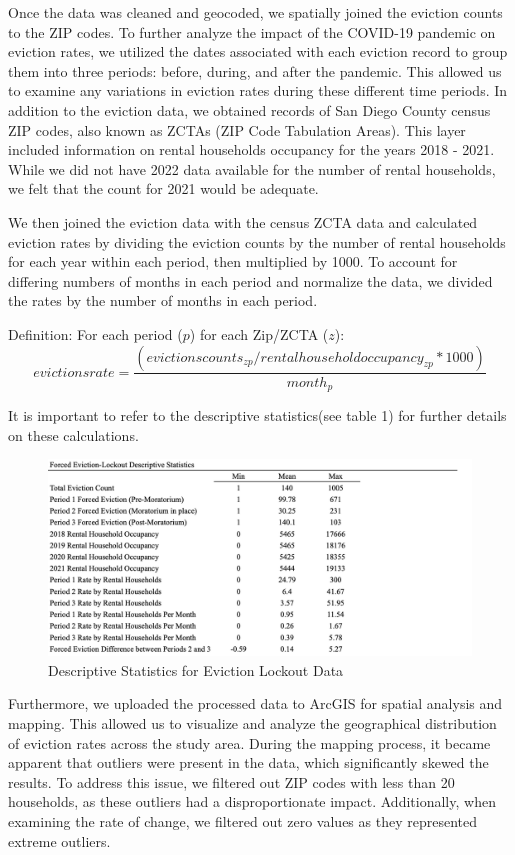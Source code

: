 \documentclass[man, 12pt, donotrepeattitle, floatsintext]{apa7} %
\begin{document}
Once the data was cleaned and geocoded, we spatially joined the eviction counts to the ZIP codes. To further analyze the impact of the COVID-19 pandemic on eviction rates, we utilized the dates associated with each eviction record to group them into three periods: before, during, and after the pandemic. This allowed us to examine any variations in eviction rates during these different time periods. In addition to the eviction data, we obtained records of San Diego County census ZIP codes, also known as ZCTAs (ZIP Code Tabulation Areas). This layer included information on rental households occupancy for the years 2018 - 2021. While we did not have 2022 data available for the number of rental households, we felt that the count for 2021 would be adequate.

We then joined the eviction data with the census ZCTA data and calculated eviction rates by dividing the eviction counts by the number of rental households for each year within each period, then multiplied by 1000. To account for differing numbers of months in each period and normalize the data, we divided the rates by the number of months in each period.

Definition: For each period ($p$) for each Zip/ZCTA ($z$):
$$evictionsrate = \frac{(evictionscounts_{zp}/rentalhouseholdoccupancy_{zp} * 1000)}{month_{p}}$$

It is important to refer to the descriptive statistics(see table 1) for further details on these calculations. 


\begin{figure}[H]
  \includegraphics[width=\linewidth]{figures/Table_1_FEviction_DescriptiveSTATS.png}
  \caption{Descriptive Statistics for Eviction Lockout Data}
  \label{fig:descriptive_stats_evictions}
\end{figure}


Furthermore, we uploaded the processed data to ArcGIS for spatial analysis and mapping. This allowed us to visualize and analyze the geographical distribution of eviction rates across the study area. During the mapping process, it became apparent that outliers were present in the data, which significantly skewed the results. To address this issue, we filtered out ZIP codes with less than 20 households, as these outliers had a disproportionate impact. Additionally, when examining the rate of change, we filtered out zero values as they represented extreme outliers.
\end{document}
